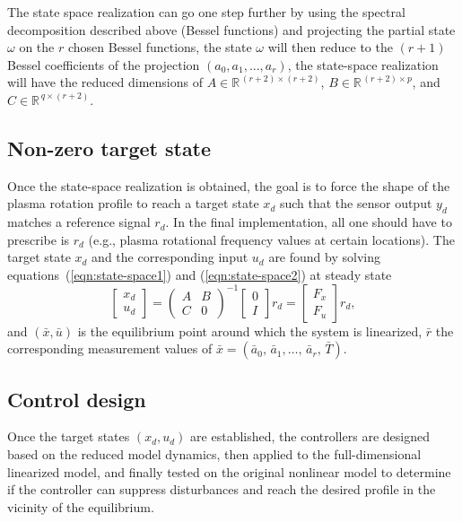 \documentclass{iopart}
\begin{document}
The state space realization can go one step further by using the spectral decomposition described above (Bessel functions) and projecting the partial state $ \omega$ on the $r$ chosen Bessel functions, the state $ \omega$ will then reduce to the $(r+1)$ Bessel coefficients of the projection $(a_{0}, a_{1}, ..., a_{r})$, the state-space realization will have the reduced dimensions of $A \in \mathbb{R}^{\, (r+2) \times (r+2)}$, $B \in \mathbb{R}^{\,(r+2) \times p}$, and $C \in \mathbb{R}^{\, q \times (r+2)}$.

\subsection{Non-zero target state}
Once the state-space realization is obtained, the goal is to force the shape of the plasma rotation profile to reach a target state $x_d$ such that the sensor output $y_d$ matches a reference signal $r_d$. In the final implementation, all one should have to prescribe is $r_d$ (e.g., plasma rotational frequency values at certain locations). The target state $x_d$ and the corresponding input $u_d$ are found by solving equations~(\ref{eqn:state-space1}) and (\ref{eqn:state-space2}) at steady state
\begin{equation}
\left[\! \begin{array}{c}  x_{d} \\ u_{d}\end{array}\!\right]
  ={ \left(\! \begin{array}{cc} A  & B \\ C & 0 \end{array} \! \right)}^{-1} \left[\! \begin{array}{c} 0 \\ I    \end{array}  \!\right] r_{d} = \left[\! \begin{array}{c} F_x \\ F_u    \end{array}  \!\right] r_{d},
\label{steadystate}
\end{equation}
and $\left( \bar{x}, \bar{u}  \right)$ is the equilibrium point around which the system is linearized, $\bar{r}$ the corresponding measurement values of $\bar{x} = \left( \bar{a}_{0},\, \bar{a}_{1},\ldots,\, \bar{a}_{r},\,\bar{T} \right)$. 
 
\subsection{Control design} 
Once the target states $\left( x_{d} , u_{d} \right)$ are established, the controllers are designed based on the reduced model dynamics, then applied to the full-dimensional linearized model, and finally tested on the original nonlinear model to determine if the controller can suppress disturbances and reach the desired profile in the vicinity of the equilibrium.
\end{document}
